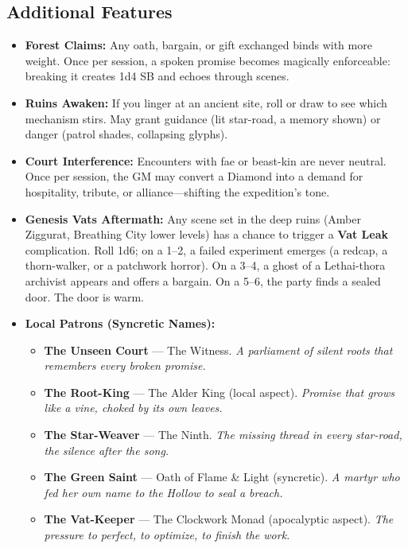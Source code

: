 \subsection*{Additional Features}
\begin{itemize}
\item \textbf{Forest Claims:} Any oath, bargain, or gift exchanged binds with more weight. Once per session, a spoken promise becomes magically enforceable: breaking it creates 1d4 SB and echoes through scenes.
\item \textbf{Ruins Awaken:} If you linger at an ancient site, roll or draw to see which mechanism stirs. May grant guidance (lit star-road, a memory shown) or danger (patrol shades, collapsing glyphs).
\item \textbf{Court Interference:} Encounters with fae or beast-kin are never neutral. Once per session, the GM may convert a Diamond into a demand for hospitality, tribute, or alliance---shifting the expedition's tone.
\item \textbf{Genesis Vats Aftermath:} Any scene set in the deep ruins (Amber Ziggurat, Breathing City lower levels) has a chance to trigger a \textbf{Vat Leak} complication. Roll 1d6; on a 1--2, a failed experiment emerges (a redcap, a thorn-walker, or a patchwork horror). On a 3--4, a ghost of a Lethai-thora archivist appears and offers a bargain. On a 5--6, the party finds a sealed door. The door is warm.
\item \textbf{Local Patrons (Syncretic Names):}
  \begin{itemize}
    \item \textbf{The Unseen Court} --- The Witness. \textit{A parliament of silent roots that remembers every broken promise.}
    \item \textbf{The Root-King} --- The Alder King (local aspect). \textit{Promise that grows like a vine, choked by its own leaves.}
    \item \textbf{The Star-Weaver} --- The Ninth. \textit{The missing thread in every star-road, the silence after the song.}
    \item \textbf{The Green Saint} --- Oath of Flame \& Light (syncretic). \textit{A martyr who fed her own name to the Hollow to seal a breach.}
    \item \textbf{The Vat-Keeper} --- The Clockwork Monad (apocalyptic aspect). \textit{The pressure to perfect, to optimize, to finish the work.}
  \end{itemize}
\end{itemize}

